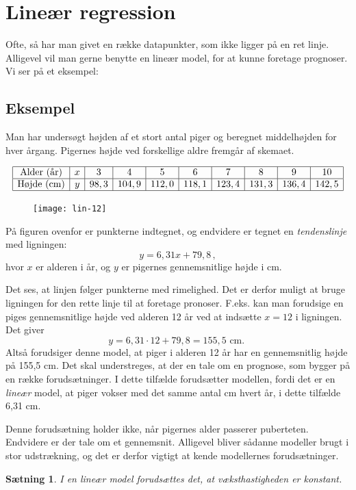 \documentclass[12pt,oneside,a4paper]{article}
\newtheorem{thm}{Sætning}[section]
\begin{document}

\section{Lineær regression}
Ofte, så har man givet en række datapunkter, som ikke ligger på en ret linje. Alligevel
vil man gerne benytte en lineær model, for at kunne foretage prognoser. Vi ser
på et eksempel:

\subsection{Eksempel}
Man har undersøgt højden af et stort antal piger og beregnet middel\-høj\-den for
hver årgang. Pigernes højde ved forskellige aldre fremgår af skemaet.

\[
\begin{array}{|c|c|c|c|c|c|c|c|c|c|}
    \hline
    \mbox{Alder (år)}& x &  3 &  4 &  5 &  6 &  7 &  8 & 9 & 10 \\
    \hline
    \mbox{Højde (cm)}& y &  98,3 &   104,9 &  112,0 &  118,1 &  123,4 &  131,3 & 136,4 & 142,5\\
    \hline
\end{array}
\]

\begin{figure}[H]
    \centering
    \texttt{[image: lin-12]}
    \caption{}
\end{figure}

På figuren ovenfor er punkterne indtegnet, og endvidere er tegnet en {\em
tendenslinje} med ligningen:
\[
    y = 6,31 x + 79,8 \,,
\]
hvor $x$ er alderen i år, og $y$ er pigernes gennemsnitlige højde i cm.

Det ses, at linjen følger punkterne med rimelighed. Det er derfor muligt at
bruge ligningen for den rette linje til at foretage pronoser. F.eks. kan man
forudsige en piges gennemsnitlige højde ved alderen 12 år ved at indsætte $x=12$
i ligningen. Det giver
\[
    y=6,31\cdot 12 + 79,8 = 155,5 \mbox{ cm. }
\]
Altså forudsiger denne model, at piger i alderen 12 år har en gennemsnitlig
højde på 155,5 cm.  Det skal understreges, at der en tale om en prognose, som
bygger på en række forudsætninger.  I dette tilfælde forudsætter modellen,
fordi det er en {\em lineær} model, at piger vokser med det samme antal cm
hvert år, i dette tilfælde 6,31 cm.

Denne forudsætning holder ikke, når pigernes alder passerer puberteten.
Endvidere er der tale om et gennemsnit.  Alligevel bliver sådanne modeller brugt
i stor udstrækning, og det er derfor vigtigt at kende modellernes
forudsætninger. 
\begin{thm}
    I en lineær model forudsættes det, at væksthastigheden er konstant.
\end{thm}
\end{document}
